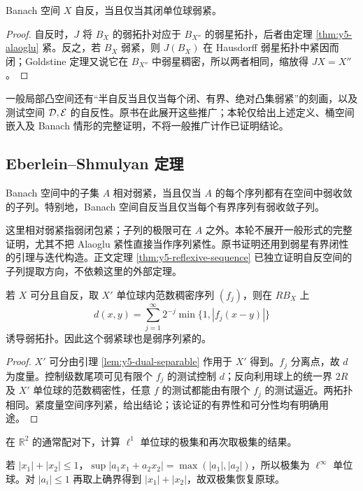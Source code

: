 \begin{theorem}\label{thm:y5-reflexive-ball}
Banach 空间 $X$ 自反，当且仅当其闭单位球弱紧。
\end{theorem}
\begin{proof}
自反时，$J$ 将 $B_X$ 的弱拓扑对应于 $B_{X''}$ 的弱星拓扑，后者由定理 \ref{thm:y5-alaoglu} 紧。反之，若 $B_X$ 弱紧，则 $J(B_X)$ 在 Hausdorff 弱星拓扑中紧因而闭；Goldstine 定理又说它在 $B_{X''}$ 中弱星稠密，所以两者相同，缩放得 $JX=X''$。
\end{proof}

一般局部凸空间还有“半自反当且仅当每个闭、有界、绝对凸集弱紧”的刻画，以及测试空间 $\mathcal{D},\mathcal{E}$ 的自反性。原书在此展开这些推广；本轮仅给出上述定义、桶空间嵌入及 Banach 情形的完整证明，不将一般推广计作已证明结论。

\subsection*{Eberlein--Shmulyan 定理}
\label{sec:yosida-05-app-04}
\begin{theorem}
Banach 空间中的子集 $A$ 相对弱紧，当且仅当 $A$ 的每个序列都有在空间中弱收敛的子列。特别地，Banach 空间自反当且仅当每个有界序列有弱收敛子列。
\end{theorem}

这里相对弱紧指弱闭包紧；子列的极限可在 $A$ 之外。本轮不展开一般形式的完整证明，尤其不把 Alaoglu 紧性直接当作序列紧性。原书证明还用到弱星有界闭性的引理与迭代构造。正文定理 \ref{thm:y5-reflexive-sequence} 已独立证明自反空间的子列提取方向，不依赖这里的外部定理。

\begin{proposition}[可分自反情形的可度量化]
若 $X$ 可分且自反，取 $X'$ 单位球内范数稠密序列 $(f_j)$，则在 $RB_X$ 上
\[
 d(x,y)=\sum_{j=1}^{\infty}2^{-j}\min\{1,|f_j(x-y)|\}
\]
诱导弱拓扑。因此这个弱紧球也是弱序列紧的。
\end{proposition}
\begin{proof}
$X'$ 可分由引理 \ref{lem:y5-dual-separable} 作用于 $X'$ 得到。$f_j$ 分离点，故 $d$ 为度量。控制级数尾项可见有限个 $f_j$ 的测试控制 $d$；反向利用球上的统一界 $2R$ 及 $X'$ 单位球的范数稠密性，任意 $f$ 的测试都能由有限个 $f_j$ 的测试逼近。两拓扑相同。紧度量空间序列紧，给出结论；该论证的有界性和可分性均有明确用途。
\end{proof}

\begin{exercise}[极集的具体计算]\label{ex:y5-polar}
在 $\mathbb R^2$ 的通常配对下，计算 $\ell^1$ 单位球的极集和再次取极集的结果。
\end{exercise}
\begin{solution}
若 $|x_1|+|x_2|\le1$，$\sup|a_1x_1+a_2x_2|=\max(|a_1|,|a_2|)$，所以极集为 $\ell^\infty$ 单位球。对 $|a_i|\le1$ 再取上确界得到 $|x_1|+|x_2|$，故双极集恢复原球。
\end{solution}


